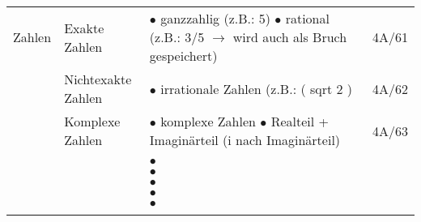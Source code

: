 \documentclass[11pt,a4paper]{article}
\begin{document}
\begin{center}
\begin{longtable}[h]{ | p{3cm} | p{3cm} | p{11cm} | p{1.2cm} | }
	{\large Zahlen} & Exakte Zahlen & \makecell[l]{$\bullet$ ganzzahlig (z.B.: 5) \\ $\bullet$ rational (z.B.: 3/5 $\rightarrow$ wird auch als Bruch gespeichert) } & 4A/61 \\ \cline{2-4}
	& \makecell[l]{Nichtexakte \\ Zahlen} & $\bullet$ irrationale Zahlen (z.B.: ( sqrt 2 ) & 4A/62 \\ \cline{2-4}
	& \makecell[l]{Komplexe \\ Zahlen} & \makecell[l]{$\bullet$ komplexe Zahlen \\ \hspace{0.4cm} $\bullet$ Realteil + Imaginärteil (i nach Imaginärteil) } & 4A/63 \\
	\hline
	
	\multicolumn{3}{c}{} \\ 
	\hline
	
	{\large } & & $\bullet$ & \\ \cline{2-4}
	&  & $\bullet$  &  \\ \cline{2-4}
	&  & $\bullet$  &  \\ \cline{2-4}
	&  & $\bullet$  &  \\ \cline{2-4}
	&  & $\bullet$  &  \\ 
	\hline
	
	\multicolumn{3}{c}{} \\ 
	\hline 
	 
	 
\end{longtable}
\end{center}
\end{document}
